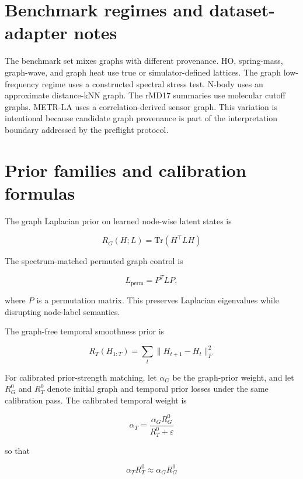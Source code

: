 \documentclass[preprint,12pt]{elsarticle}
\begin{document}
\section{Benchmark regimes and dataset-adapter notes}

The benchmark set mixes graphs with different provenance. HO, spring-mass, graph-wave, and graph heat use true or simulator-defined lattices. The graph low-frequency regime uses a constructed spectral stress test. N-body uses an approximate distance-kNN graph. The rMD17 summaries use molecular cutoff graphs. METR-LA uses a correlation-derived sensor graph. This variation is intentional because candidate graph provenance is part of the interpretation boundary addressed by the preflight protocol.

\section{Prior families and calibration formulas}

The graph Laplacian prior on learned node-wise latent states is

\begin{equation}
R_G(H;L)=\mathrm{Tr}(H^\top L H)
\end{equation}

The spectrum-matched permuted graph control is

\begin{equation}
L_{\mathrm{perm}} = P^T L P,
\end{equation}

where $P$ is a permutation matrix. This preserves Laplacian eigenvalues while disrupting node-label semantics.

The graph-free temporal smoothness prior is

\begin{equation}
R_T(H_{1:T})=\sum_t \lVert H_{t+1}-H_t \rVert_F^2
\end{equation}

For calibrated prior-strength matching, let $\alpha_G$ be the graph-prior weight, and let $R_G^0$ and $R_T^0$ denote initial graph and temporal prior losses under the same calibration pass. The calibrated temporal weight is

\begin{equation}
\alpha_T = \frac{\alpha_G R_G^0}{R_T^0+\varepsilon}
\end{equation}

so that

\begin{equation}
\alpha_T R_T^0 \approx \alpha_G R_G^0
\end{equation}
\end{document}
